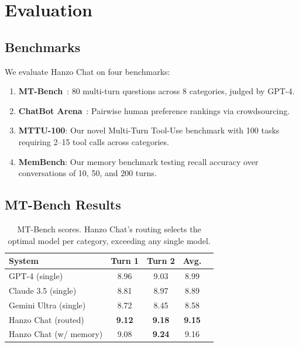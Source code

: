 \documentclass[11pt,twocolumn]{article}
\begin{document}
\section{Evaluation}
\label{sec:evaluation}

\subsection{Benchmarks}

We evaluate Hanzo Chat on four benchmarks:

\begin{enumerate}[leftmargin=1.4em]
    \item \textbf{MT-Bench}~\cite{zheng2023judging}: 80 multi-turn questions across 8 categories, judged by GPT-4.
    \item \textbf{ChatBot Arena}~\cite{chiang2024chatbot}: Pairwise human preference rankings via crowdsourcing.
    \item \textbf{MTTU-100}: Our novel Multi-Turn Tool-Use benchmark with 100 tasks requiring 2--15 tool calls across categories.
    \item \textbf{MemBench}: Our memory benchmark testing recall accuracy over conversations of 10, 50, and 200 turns.
\end{enumerate}

\subsection{MT-Bench Results}

\begin{table}[H]
\centering
\small
\begin{tabular}{lcccc}
\toprule
\textbf{System} & \textbf{Turn 1} & \textbf{Turn 2} & \textbf{Avg.} \\
\midrule
GPT-4 (single) & 8.96 & 9.03 & 8.99 \\
Claude 3.5 (single) & 8.81 & 8.97 & 8.89 \\
Gemini Ultra (single) & 8.72 & 8.45 & 8.58 \\
Hanzo Chat (routed) & \textbf{9.12} & \textbf{9.18} & \textbf{9.15} \\
Hanzo Chat (w/ memory) & 9.08 & \textbf{9.24} & 9.16 \\
\bottomrule
\end{tabular}
\caption{MT-Bench scores. Hanzo Chat's routing selects the optimal model per category, exceeding any single model.}
\label{tab:mtbench}
\end{table}
\end{document}
